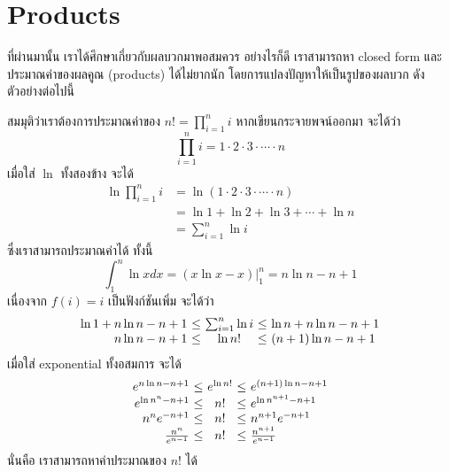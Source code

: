 \section{Products}

ที่ผ่านมานั้น เราได้ศึกษาเกี่ยวกับผลบวกมาพอสมควร \enskip อย่างไรก็ดี เราสามารถหา closed form และประมาณค่าของผลคูณ (products) ได้ไม่ยากนัก โดยการแปลงปัญหาให้เป็นรูปของผลบวก ดังตัวอย่างต่อไปนี้
%
\begin{example}
สมมุติว่าเราต้องการประมาณค่าของ $n!=\prod_{i=1}^n{i}$ \enskip หากเขียนกระจายพจน์ออกมา จะได้ว่า \[\prod_{i=1}^n{i}=1\cdot 2\cdot 3\cdot \cdots \cdot n\] เมื่อใส่ $\ln$ ทั้งสองข้าง จะได้
\begin{align*}
\ln\prod_{i=1}^n{i}
 &= \ln(1\cdot 2\cdot 3\cdot \cdots \cdot n) \\
 &= \ln 1 + \ln 2 + \ln 3 + \cdots + \ln n \\
 &= \sum_{i=1}^n{\ln i}
\end{align*}
ซึ่งเราสามารถประมาณค่าได้ \enskip ทั้งนี้ \[\int_1^n \ln x dx=\left.(x\ln x-x)\right|_1^n=n\ln n-n+1\] เนื่องจาก $f(i)=i$ เป็นฟังก์ชันเพิ่ม จะได้ว่า \[
\begin{array}{r@{\ \leq\ }c@{\ \leq\ }l}
\ln 1 + n\ln n-n+1 & \sum_{i=1}^n{\ln i} & \ln n + n\ln n-n+1 \\
n\ln n-n+1 & \ln n! & (n+1)\ln n-n+1
\end{array}
\]
เมื่อใส่ exponential ทั้งอสมการ จะได้ \[
\begin{array}{r@{\ \leq\ }c@{\ \leq\ }l}
e^{n\ln n-n+1} & e^{\ln n!} & e^{(n+1)\ln n-n+1} \\
e^{\ln n^n-n+1} & n! & e^{\ln n^{n+1}-n+1} \\
n^ne^{-n+1} & n! & n^{n+1}e^{-n+1} \\
\frac{n^n}{e^{n-1}} & n! & \frac{n^{n+1}}{e^{n-1}}
\end{array}
\]
นั่นคือ เราสามารถหาค่าประมาณของ $n!$ ได้
\end{example}
